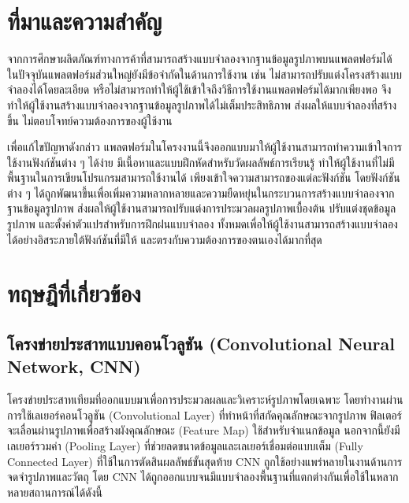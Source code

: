 \documentclass[12pt,oneside,openright,a4paper]{cpe-thai-project}
\begin{document}
\section{ที่มาและความสําคัญ}

\hspace{2em}จากการศึกษาผลิตภัณฑ์ทางการค้าที่สามารถสร้างแบบจำลองจากฐานข้อมูลรูปภาพบนแพลตฟอร์มได้ ในปัจจุบันแพลตฟอร์มส่วนใหญ่ยังมีข้อจำกัดในด้านการใช้งาน เช่น ไม่สามารถปรับแต่งโครงสร้างแบบจำลองได้โดยละเอียด หรือไม่สามารถทำให้ผู้ใช้เข้าใจถึงวิธีการใช้งานแพลตฟอร์มได้มากเพียงพอ จึงทำให้ผู้ใช้งานสร้างแบบจำลองจากฐานข้อมูลรูปภาพได้ไม่เต็มประสิทธิภาพ ส่งผลให้แบบจำลองที่สร้างขึ้น ไม่ตอบโจทย์ความต้องการของผู้ใช้งาน

\hspace{2em}เพื่อแก้ไขปัญหาดังกล่าว แพลตฟอร์มในโครงงานนี้จึงออกแบบมาให้ผู้ใช้งานสามารถทำความเข้าใจการใช้งานฟังก์ชันต่าง ๆ ได้ง่าย มีเนื้อหาและแบบฝึกหัดสำหรับวัดผลลัพธ์การเรียนรู้ ทำให้ผู้ใช้งานที่ไม่มีพื้นฐานในการเขียนโปรแกรมสามารถใช้งานได้ เพียงเข้าใจความสามารถของแต่ละฟังก์ชัน โดยฟังก์ชันต่าง ๆ ได้ถูกพัฒนาขึ้นเพื่อเพิ่มความหลากหลายและความยืดหยุ่นในกระบวนการสร้างแบบจำลองจากฐานข้อมูลรูปภาพ ส่งผลให้ผู้ใช้งานสามารถปรับแต่งการประมวลผลรูปภาพเบื้องต้น ปรับแต่งชุดข้อมูลรูปภาพ และตั้งค่าตัวแปรสำหรับการฝึกฝนแบบจำลอง ทั้งหมดเพื่อให้ผู้ใช้งานสามารถสร้างแบบจำลองได้อย่างอิสระภายใต้ฟังก์ชันที่มีให้ และตรงกับความต้องการของตนเองได้มากที่สุด

\section{ทฤษฎีที่เกี่ยวข้อง}

\subsection{โครงข่ายประสาทแบบคอนโวลูชัน (Convolutional Neural Network, CNN)}
\hspace{2em}โครงข่ายประสาทเทียมที่ออกแบบมาเพื่อการประมวลผลและวิเคราะห์รูปภาพโดยเฉพาะ โดยทำงานผ่านการใช้เลเยอร์คอนโวลูชัน (Convolutional Layer) ที่ทำหน้าที่สกัดคุณลักษณะจากรูปภาพ ฟิลเตอร์จะเลื่อนผ่านรูปภาพเพื่อสร้างผังคุณลักษณะ 
(Feature Map) ใช้สำหรับจำแนกข้อมูล นอกจากนี้ยังมีเลเยอร์รวมค่า (Pooling Layer) ที่ช่วยลดขนาดข้อมูลและเลเยอร์เชื่อมต่อแบบเต็ม (Fully Connected Layer) ที่ใช้ในการตัดสินผลลัพธ์ขั้นสุดท้าย CNN ถูกใช้อย่างแพร่หลายในงานด้านการจดจำรูปภาพและวัตถุ \cite{cnn} โดย CNN ได้ถูกออกแบบจนมีแบบจำลองพื้นฐานที่แตกต่างกันเพื่อใช้ในหลากหลายสถานการณ์ได้ดังนี้
\end{document}
